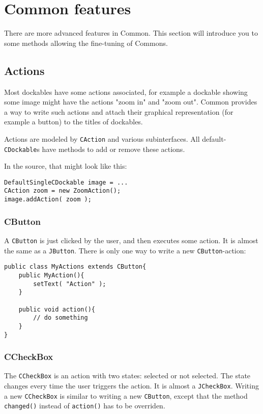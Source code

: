 \documentclass[a4paper,10pt]{article}
\newcommand{\src}[1]{\lstinline[basicstyle=\ttfamily]|#1|}
\begin{document}
\section{Common features}
There are more advanced features in Common. This section will introduce you to some methods allowing the fine-tuning of Commons.

\subsection{Actions}
Most dockables have some actions associated, for example a dockable showing some image might have the actions "zoom in" and "zoom out". Common provides a way to write such actions and attach their graphical representation (for example a button) to the titles of dockables. 

Actions are modeled by \src{CAction} and various subinterfaces. All default-\src{CDockable}s have methods to add or remove these actions.

In the source, that might look like this:
\begin{lstlisting}
DefaultSingleCDockable image = ...
CAction zoom = new ZoomAction();
image.addAction( zoom );
\end{lstlisting}

\subsubsection{CButton}
A \src{CButton} is just clicked by the user, and then executes some action. It is almost the same as a \src{JButton}. There is only one way to write a new \src{CButton}-action:

\begin{lstlisting}
public class MyActions extends CButton{
	public MyAction(){
		setText( "Action" );
	}

	public void action(){
		// do something
	}
}
\end{lstlisting}

\subsubsection{CCheckBox}
The \src{CCheckBox} is an action with two states: selected or not selected. The state changes every time the user triggers the action. It is almost a \src{JCheckBox}. Writing a new \src{CCheckBox} is similar to writing a new \src{CButton}, except that the method \src{changed()} instead of \src{action()} has to be overriden.
\end{document}
